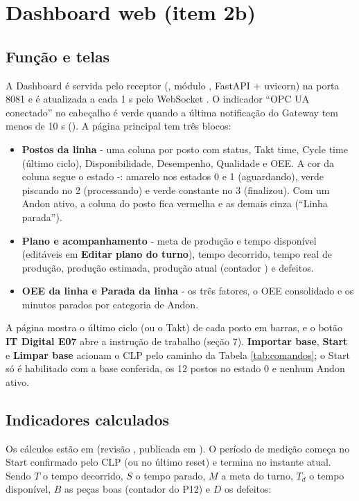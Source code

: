 \section{Dashboard web (item 2b)}

\subsection{Função e telas}

A Dashboard é servida pelo receptor (, módulo , FastAPI + uvicorn) na porta 8081 e é atualizada a cada 1 s pelo WebSocket . O indicador ``OPC UA conectado'' no cabeçalho é verde quando a última notificação do Gateway tem menos de 10 s (). A página principal tem três blocos:

\begin{itemize}
    \item \textbf{Postos da linha} - uma coluna por posto com status, Takt time, Cycle time (último ciclo), Disponibilidade, Desempenho, Qualidade e OEE. A cor da coluna segue o estado -: amarelo nos estados 0 e 1 (aguardando), verde piscando no 2 (processando) e verde constante no 3 (finalizou). Com um Andon ativo, a coluna do posto fica vermelha e as demais cinza (``Linha parada'').
    \item \textbf{Plano e acompanhamento} - meta de produção e tempo disponível (editáveis em \textbf{Editar plano do turno}), tempo decorrido, tempo real de produção, produção estimada, produção atual (contador ) e defeitos.
    \item \textbf{OEE da linha e Parada da linha} - os três fatores, o OEE consolidado e os minutos parados por categoria de Andon.
\end{itemize}

A página  mostra o último ciclo (ou o Takt) de cada posto em barras, e o botão \textbf{IT Digital E07} abre a instrução de trabalho (seção 7). \textbf{Importar base}, \textbf{Start} e \textbf{Limpar base} acionam o CLP pelo caminho da Tabela \ref{tab:comandos}; o Start só é habilitado com a base conferida, os 12 postos no estado 0 e nenhum Andon ativo.

\subsection{Indicadores calculados}

Os cálculos estão em  (revisão , publicada em ). O período de medição começa no Start confirmado pelo CLP (ou no último reset) e termina no instante atual. Sendo $T$ o tempo decorrido, $S$ o tempo parado, $M$ a meta do turno, $T_d$ o tempo disponível, $B$ as peças boas (contador do P12) e $D$ os defeitos:

